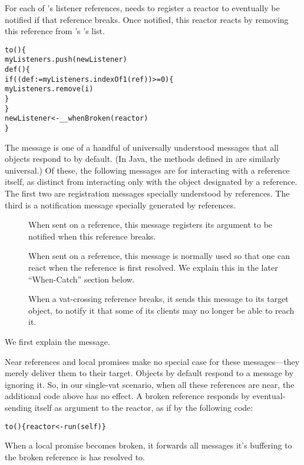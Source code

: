 \documentclass{llncs}
\begin{document}
For each of 's listener references,  needs to
register a reactor to eventually be notified if that reference
breaks. Once notified, this reactor reacts by removing this reference
from 's 's list.
%
\begin{alltt}
    to () \{
        myListeners.push(newListener)
        def () \{
            if ((def  := myListeners.indexOf1(ref)) >= 0) \{
                myListeners.remove(i)
            \}
        \}
        newListener <- \_\_whenBroken(reactor)
    \}
\end{alltt}
%
The  message is one of a handful of universally
understood messages that all objects respond to by default. (In Java,
the methods defined in  are similarly
universal.) Of these, the following messages are for interacting with
a reference itself, as distinct from interacting only with the object
designated by a reference. The first two are registration messages
specially understood by references. The third is a notification
message specially generated by references.
%
\begin{description}
\item[] When sent on a reference,
  this message registers its argument to be notified when this
  reference breaks.
\item[] When sent on a
  reference, this message is normally used so that one can react when
  the reference is first resolved. We explain this in the later
  ``When-Catch'' section below.
\item[] When a
  vat-crossing reference breaks, it sends this message to its target
  object, to notify it that some of its clients may no longer be able
  to reach it.
\end{description}
%
We first explain the  message.

Near references and local promises make no special case for these
messages---they merely deliver them to their target. Objects by
default respond to a  message by ignoring it. So,
in our single-vat scenario, when all these references are near, the
additional code above has no effect. A broken reference responds by
eventual-sending itself as argument to the reactor, as if by the
following code:
%
\begin{alltt}
    to () \{ reactor <- run(self) \}
\end{alltt}
%
When a local promise becomes broken, it forwards all messages it's
buffering to the broken reference is has resolved to. 
\end{document}
